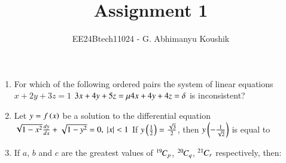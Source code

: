 \documentclass[journal,12pt,onecolumn]{IEEEtran}
\theoremstyle{remark}
\begin{document}
\title{Assignment 1}
\author{EE24Btech11024 - G. Abhimanyu Koushik}
\maketitle
\renewcommand{\thefigure}{\theenumi}
\renewcommand{\thetable}{\theenumi}
\begin{enumerate}
\item For which of the following ordered pairs \brak{\mu,\delta} the system of linear equations\newline
$x+2y+3z=1$\newline
$3x+4y+5z=\mu\newline
4x+4y+4z=\delta$\newline
is inconsistent?
\begin{enumerate}
\end{enumerate}

\item Let $y=f\left(x\right)$ be a solution to the differential equation\newline
$\sqrt{1-x^2}\frac{dy}{dx}+\sqrt{1-y^2} = 0 \text{, } \left\vert x\right\vert<1$\newline
If $y\left(\frac{1}{2}\right) = \frac{\sqrt{3}}{2}$, then $y\left(-\frac{1}{\sqrt{2}}\right)$ is equal to
\begin{enumerate}
\end{enumerate}

\item If $a$, $b$ and $c$ are the greatest values of ${{}^{19}\mkern-1muC_{p}}$, ${{}^{20}\mkern-1muC_{q}}$, ${{}^{21}\mkern-1muC_{r}}$ respectively, then:
\begin{enumerate}
\end{enumerate}


\end{enumerate}
\end{document}
